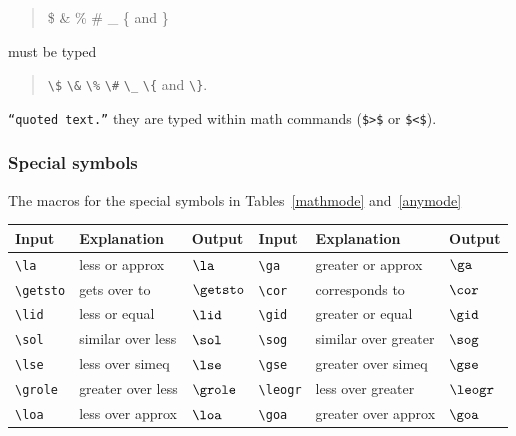 \begin{quote}
\$ \& \% \# \_ \{ and \}
\end{quote}
must be typed
\begin{center}
\begin{quote}
\verb"\$" \verb"\&" \verb"\%" \verb"\#" \verb"\_" \verb"\{" and \verb"\}".
\end{quote}
\end{center}

\texttt{``quoted text.''} they are typed within math commands (\verb"$>$" or \verb"$<$").

\subsubsection{Special symbols}

The macros for the special symbols in Tables~\ref{mathmode} and~\ref{anymode}
%
\begin{table*}
\begin{minipage}{106mm}
\caption{Special symbols which can only be used in math mode.}\label{mathmode}
\begin{tabular}{@{}llllll}
Input & Explanation & Output & Input & Explanation & Output\\
\toprule
\verb"\la"     & less or approx       & $\la$     &
\verb"\ga"     & greater or approx    & $\ga$\\[2pt]
\verb"\getsto" & gets over to         & $\getsto$ &
\verb"\cor"    & corresponds to       & $\cor$\\[2pt]
\verb"\lid"    & less or equal        & $\lid$    &
\verb"\gid"    & greater or equal     & $\gid$\\[2pt]
\verb"\sol"    & similar over less    & $\sol$    &
\verb"\sog"    & similar over greater & $\sog$\\[2pt]
\verb"\lse"    & less over simeq      & $\lse$    &
\verb"\gse"    & greater over simeq   & $\gse$\\[2pt]
\verb"\grole"  & greater over less    & $\grole$  &
\verb"\leogr"  & less over greater    & $\leogr$\\[2pt]
\verb"\loa"    & less over approx     & $\loa$    &
\verb"\goa"    & greater over approx  & $\goa$\\
\bottomrule
\end{tabular}
\end{minipage}
\end{table*}
%
